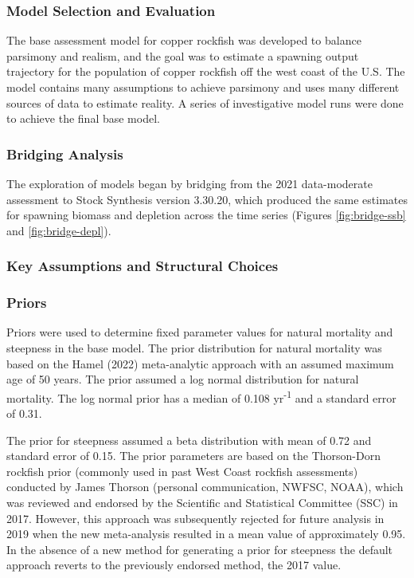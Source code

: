 \documentclass[11pt,
  english,
  letterpaper,
]{article}
\begin{document}
\hypertarget{model-selection-and-evaluation}{%
\subsubsection{Model Selection and Evaluation}\label{model-selection-and-evaluation}}

The base assessment model for copper rockfish was developed to balance parsimony and realism, and the goal was to estimate a spawning output trajectory for the population of copper rockfish off the west coast of the U.S. The model contains many assumptions to achieve parsimony and uses many different sources of data to estimate reality. A series of investigative model runs were done to achieve the final base model.

\hypertarget{bridging-analysis}{%
\subsubsection{Bridging Analysis}\label{bridging-analysis}}

The exploration of models began by bridging from the 2021 data-moderate assessment to Stock Synthesis version 3.30.20, which produced the same estimates for spawning biomass and depletion across the time series (Figures \ref{fig:bridge-ssb} and \ref{fig:bridge-depl}).

\hypertarget{key-assumptions-and-structural-choices}{%
\subsubsection{Key Assumptions and Structural Choices}\label{key-assumptions-and-structural-choices}}

\hypertarget{priors}{%
\subsubsection{Priors}\label{priors}}

Priors were used to determine fixed parameter values for natural mortality and steepness in the base model. The prior distribution for natural mortality was based on the Hamel (2022) meta-analytic approach with an assumed maximum age of 50 years. The prior assumed a log normal distribution for natural mortality. The log normal prior has a median of 0.108 yr\textsuperscript{-1} and a standard error of 0.31.

The prior for steepness assumed a beta distribution with mean of 0.72 and standard error of 0.15. The prior parameters are based on the Thorson-Dorn rockfish prior (commonly used in past West Coast rockfish assessments) conducted by James Thorson (personal communication, NWFSC, NOAA), which was reviewed and endorsed by the Scientific and Statistical Committee (SSC) in 2017. However, this approach was subsequently rejected for future analysis in 2019 when the new meta-analysis resulted in a mean value of approximately 0.95. In the absence of a new method for generating a prior for steepness the default approach reverts to the previously endorsed method, the 2017 value.
\end{document}

